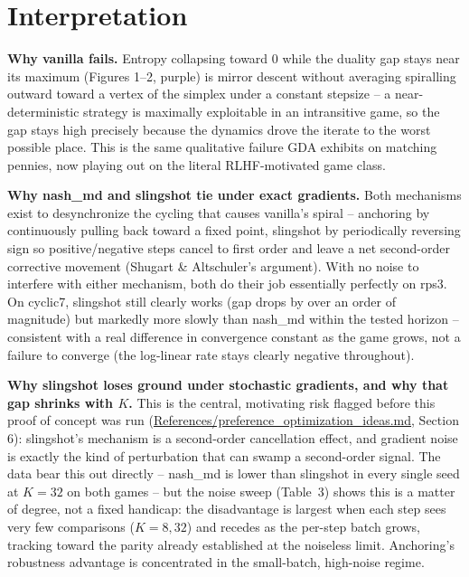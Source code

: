 \documentclass[11pt]{article}
\begin{document}
\section{Interpretation}
\textbf{Why vanilla fails.} Entropy collapsing toward 0 while the duality
gap stays near its maximum (Figures 1--2, purple) is mirror descent without
averaging spiralling outward toward a vertex of the simplex under a
constant stepsize -- a near-deterministic strategy is maximally exploitable
in an intransitive game, so the gap stays high precisely because the
dynamics drove the iterate to the worst possible place. This is the same
qualitative failure GDA exhibits on matching pennies, now playing out on the
literal RLHF-motivated game class.

\textbf{Why nash\_md and slingshot tie under exact gradients.} Both
mechanisms exist to desynchronize the cycling that causes vanilla's
spiral -- anchoring by continuously pulling back toward a fixed point,
slingshot by periodically reversing sign so positive/negative steps cancel
to first order and leave a net second-order corrective movement
(Shugart \& Altschuler's argument). With no noise to interfere with either
mechanism, both do their job essentially perfectly on rps3. On cyclic7,
slingshot still clearly works (gap drops by over an order of magnitude) but
markedly more slowly than nash\_md within the tested horizon -- consistent
with a real difference in convergence constant as the game grows, not a
failure to converge (the log-linear rate stays clearly negative throughout).

\textbf{Why slingshot loses ground under stochastic gradients, and why that
gap shrinks with $K$.} This is the central, motivating risk flagged before
this proof of concept was run (\url{References/preference_optimization_ideas.md},
Section 6): slingshot's mechanism is a second-order cancellation effect, and
gradient noise is exactly the kind of perturbation that can swamp a
second-order signal. The data bear this out directly -- nash\_md is lower
than slingshot in every single seed at $K=32$ on both games -- but the
noise sweep (Table~3) shows this is a matter of degree, not a fixed
handicap: the disadvantage is largest when each step sees very few
comparisons ($K=8,32$) and recedes as the per-step batch grows, tracking
toward the parity already established at the noiseless limit. Anchoring's
robustness advantage is concentrated in the small-batch, high-noise regime.
\end{document}
